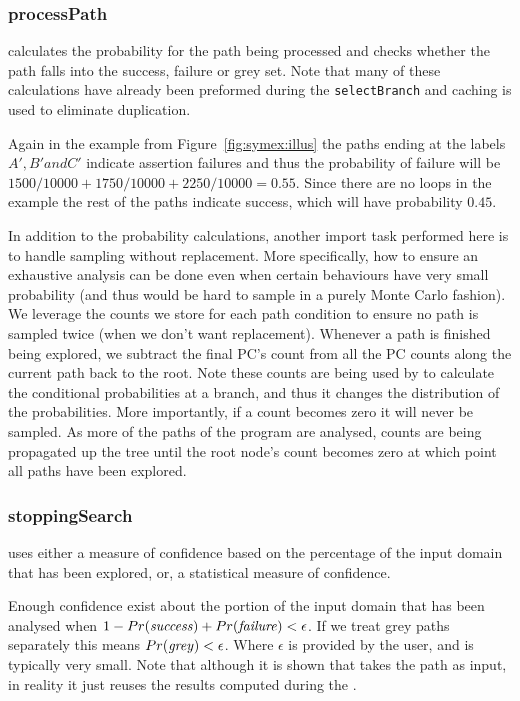 \subsubsection{processPath} calculates the probability for the path being processed and checks whether the path falls into the success, failure or grey set. Note that many of these calculations have already been preformed during the {\tt selectBranch} and caching is used to eliminate duplication. 

Again in the example from Figure~\ref{fig:symex:illus} the paths ending at the labels $A', B' and C'$ indicate assertion failures and thus the probability of failure will be $1500/10000 + 1750/10000 + 2250/10000 = 0.55$.  Since there are no loops in the example the rest of the paths indicate success, which will have probability $0.45$.

In addition to the probability calculations, another import task performed here is to handle sampling without replacement. More specifically, how to ensure an exhaustive analysis can be done even when certain behaviours have very small probability (and thus would be hard to sample in a purely Monte Carlo fashion). We leverage the counts we store for each path condition to ensure no path is sampled twice (when we don't want replacement). Whenever a path is finished being explored, we subtract the final PC's count from all the PC counts along the current path back to the root. Note these counts are being used by  to calculate the conditional probabilities at a branch, and thus it changes the distribution of the probabilities. More importantly, if a count becomes zero it will never be sampled. As more of the paths of the program are analysed, 
counts are being propagated up the tree until the root node's count becomes zero at which point all paths have been explored. 

\subsubsection{stoppingSearch} uses either a measure of confidence based on the percentage of the input domain that has been explored, or, a statistical measure of confidence. 

Enough confidence exist about the portion of the input domain that has been analysed when  $1 - Pr(\mathit{success}) + Pr(\mathit{failure}) < \epsilon$.  If we treat grey paths separately this means $Pr(\mathit{grey}) < \epsilon$. Where $\epsilon$ is provided by the user, and is typically very small. Note that although it is shown that  takes the path as input, in reality it just reuses the results computed during the . 

